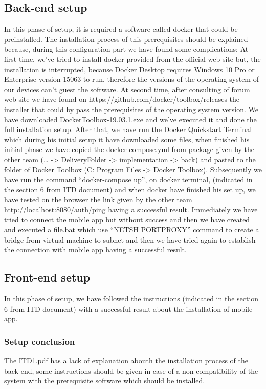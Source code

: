 \subsection{Back-end setup}
In this phase of setup, it is required a software called docker that could be preinstalled. The installation process of this prerequisites should be explained because, during this configuration part we have found some complications: 
At first time, we’ve tried to install docker provided from the official web site but, the installation is interrupted, because Docker Desktop requires Windows 10 Pro or Enterprise version 15063 to run, therefore the versions of the operating system of our devices can’t guest the software. At second time, after consulting of forum web site we have found on https://github.com/docker/toolbox/releases the installer that could by pass the prerequisites of the operating system version. We have downloaded DockerToolbox-19.03.1.exe and we’ve executed it and done the full installation setup. After that, we have run the Docker Quickstart Terminal which during his initial setup it have downloaded some files, when finished his initial phase we have copied the docker-compose.yml from package given by the other team (… -> DeliveryFolder -> implementation -> back) and pasted to the folder of Docker Toolbox (C: Program Files -> Docker Toolbox). Subsequently  we have run the command “docker-compose up”, on docker terminal, (indicated in the section 6 from ITD document) and when docker have finished his set up, we have tested on the browser the link given by the other team http://localhost:8080/auth/ping having a successful result.  Immediately we have tried to connect the mobile app but without success and then we have created and executed a file.bat which use “NETSH PORTPROXY” command to create a bridge from virtual machine to subnet and then we have tried again to establish the connection with mobile app having a successful result.

\subsection{Front-end setup}
In this phase of setup, we have followed the instructions (indicated in the section 6 from ITD document) with a successful result about the installation of mobile app.
\subsubsection{Setup conclusion}
The ITD1.pdf has a lack of explanation abouth the installation process of the back-end, some instructions should be given in case of a non compatibility of the system with the prerequisite software which should be installed.









